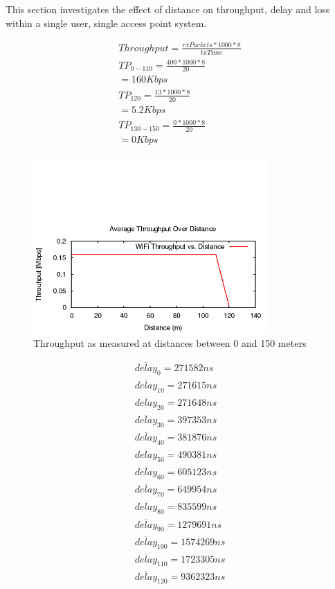 This section investigates the effect of distance on throughput, delay and loss
within a single user, single access point system.

\begin{gather*}
	Throughput=\frac{rxPackets*1000*8}{txTime} \\
	TP_{0-110}=\frac{400*1000*8}{20}\\
	= 160Kbps\\
	TP_{120}= \frac{13*1000*8}{20}\\
	= 5.2Kbps \\
	TP_{130-150}=\frac{0*1000*8}{20}\\
	= 0Kbps
\end{gather*}

\begin{figure}[H]
	\centering
	\includegraphics[width=0.8\textwidth]{images/EE500/QB/Images/wifi-throughput}
	\caption{Throughput as measured at distances between 0 and 150 meters}
	\label{fig:QBthroughput}
\end{figure}

\begin{gather*}
	\overline{delay}_0=271582ns \\
	\overline{delay}_{10}=271615ns \\
	\overline{delay}_{20}=271648ns \\
	\overline{delay}_{30}=397353ns \\
	\overline{delay}_{40}=381876ns \\
	\overline{delay}_{50}=490381ns \\
	\overline{delay}_{60}=605123ns \\
	\overline{delay}_{70}=649954ns \\
	\overline{delay}_{80}=835599ns \\
	\overline{delay}_{90}=1279691ns \\
	\overline{delay}_{100}=1574269ns \\
	\overline{delay}_{110}=1723305ns \\
	\overline{delay}_{120}=9362323ns \\
\end{gather*}

